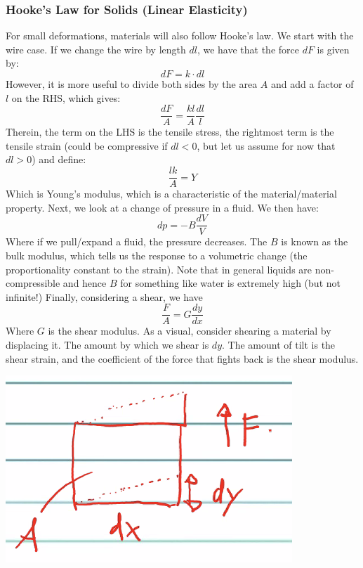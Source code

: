 \documentclass[../PHYS306Notes.tex]{subfiles}
\begin{document}
\subsubsection{Hooke's Law for Solids (Linear Elasticity)}
For small deformations, materials will also follow Hooke's law. We start with the wire case. If we change the wire by length $dl$, we have that the force $dF$ is given by:
\[dF = k\cdot dl\]
However, it is more useful to divide both sides by the area $A$ and add a factor of $l$ on the RHS, which gives:
\[\frac{dF}{A} = \frac{kl}{A}\frac{dl}{l}\]
Therein, the term on the LHS is the tensile stress, the rightmost term is the tensile strain (could be compressive if $dl < 0$, but let us assume for now that $dl > 0$) and define:
\[\frac{lk}{A} = Y\]
Which is Young's modulus, which is a characteristic of the material/material property. 
\newline Next, we look at a change of pressure in a fluid. We then have:
\[dp = -B\frac{dV}{V}\]
Where if we pull/expand a fluid, the pressure decreases. The $B$ is known as the bulk modulus, which tells us the response to a volumetric change (the proportionality constant to the strain). Note that in general liquids are non-compressible and hence $B$ for something like water is extremely high (but not infinite!)
\newline Finally, considering a shear, we have
\[\frac{F}{A} = G\frac{dy}{dx}\]
Where $G$ is the shear modulus. As a visual, consider shearing a material by displacing it. The amount by which we shear is $dy$. The amount of tilt is the shear strain, and the coefficient of the force that fights back is the shear modulus.
\begin{center}
    \includegraphics[]{Lecture-30/l30-img6.png}
\end{center}
\end{document}
